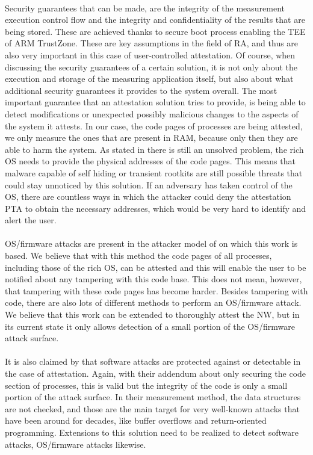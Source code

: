 \paragraph*{}
Security guarantees that can be made, are the integrity of the measurement execution control flow and the integrity and confidentiality of the results that are being stored. These are achieved thanks to secure boot process enabling the TEE of ARM TrustZone. These are key assumptions in the field of RA, and thus are also very important in this case of user-controlled attestation. Of course, when discussing the security guarantees of a certain solution, it is not only about the execution and storage of the measuring application itself, but also about what additional security guarantees it provides to the system overall. The most important guarantee that an attestation solution tries to provide, is being able to detect modifications or unexpected possibly malicious changes to the aspects of the system it attests. In our case, the code pages of processes are being attested, we only measure the ones that are present in RAM, because only then they are able to harm the system. As stated in \cite{LingZhen2021Sbtb} there is still an unsolved problem, the rich OS needs to provide the physical addresses of the code pages. This means that malware capable of self hiding or transient rootkits are still possible threats that could stay unnoticed by this solution. If an adversary has taken control of the OS, there are countless ways in which the attacker could deny the attestation PTA to obtain the necessary addresses, which would be very hard to identify and alert the user.

\paragraph*{}
OS/firmware attacks are present in the attacker model of \cite{LingZhen2021Sbtb} on which this work is based. We believe that with this method the code pages of all processes, including those of the rich OS, can be attested and this will enable the user to be notified about any tampering with this code base. This does not mean, however, that tampering with these code pages has become harder. Besides tampering with code, there are also lots of different methods to perform an OS/firmware attack. We believe that this work can be extended to thoroughly attest the NW, but in its current state it only allows detection of a small portion of the OS/firmware attack surface.

\paragraph*{}
It is also claimed by \cite{LingZhen2021Sbtb} that software attacks are protected against or detectable in the case of attestation. Again, with their addendum about only securing the code section of processes, this is valid but the integrity of the code is only a small portion of the attack surface. In their measurement method, the data structures are not checked, and those are the main target for very well-known attacks that have been around for decades, like buffer overflows and return-oriented programming. Extensions to this solution need to be realized to detect software attacks, OS/firmware attacks likewise.